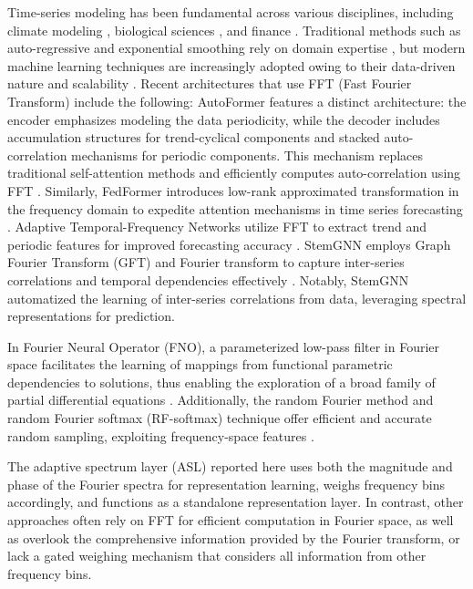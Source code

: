 Time-series modeling has been fundamental across various disciplines, including climate modeling \cite{mudelsee2019trend}, biological sciences \cite{stoffer2012special}, and finance \cite{bose2017probabilistic}. Traditional methods such as auto-regressive and exponential smoothing rely on domain expertise \cite{box2015time}, but modern machine learning techniques are increasingly adopted owing to their data-driven nature and scalability \cite{time_series_survey}.
Recent architectures that use FFT (Fast Fourier Transform) include the following: 
AutoFormer features a distinct architecture: the encoder emphasizes modeling the data periodicity, while the decoder includes accumulation structures for trend-cyclical components and stacked auto-correlation mechanisms for periodic components. This mechanism replaces traditional self-attention methods and efficiently computes auto-correlation using FFT \cite{wu2021autoformer}. Similarly, FedFormer introduces low-rank approximated transformation in the frequency domain to expedite attention mechanisms in time series forecasting \cite{zhou2022fedformer}. Adaptive Temporal-Frequency Networks utilize FFT to extract trend and periodic features for improved forecasting accuracy \cite{adapt-temp-freq-net}. StemGNN employs Graph Fourier Transform (GFT) and Fourier transform to capture inter-series correlations and temporal dependencies effectively \cite{cao2021spectral}. Notably, StemGNN automatized the learning of inter-series correlations from data, leveraging spectral representations for prediction.

In Fourier Neural Operator (FNO), a parameterized low-pass filter in Fourier space facilitates the learning of mappings from functional parametric dependencies to solutions, thus enabling the exploration of a broad family of partial differential equations \cite{li2020fourier}. Additionally, the random Fourier method and random Fourier softmax (RF-softmax) technique offer efficient and accurate random sampling, exploiting frequency-space features \cite{rawat2019sampled}.

The adaptive spectrum layer (ASL) reported here uses both the magnitude and phase of the Fourier spectra for representation learning, weighs frequency bins accordingly, and functions as a standalone representation layer. In contrast, other approaches often rely on FFT for efficient computation in Fourier space, as well as overlook the comprehensive information provided by the Fourier transform, or lack a gated weighing mechanism that considers all information from other frequency bins.